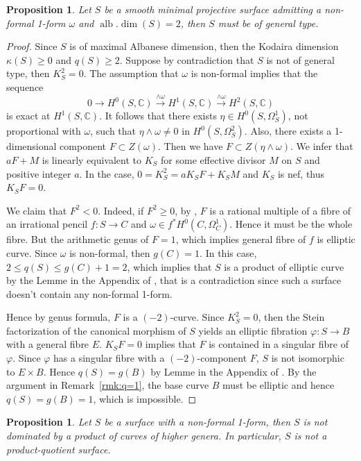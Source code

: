\documentclass[a4paper,12pt,reqno]{amsart}
\newtheorem{proposition}[theorem]{Proposition}
\theoremstyle{question}
\theoremstyle{definition}
\theoremstyle{remark}
\theoremstyle{cited}
\theoremstyle{citeddef}
\def\CC{{\mathbb C}}
\def\phi{{\varphi}}
\DeclareMathOperator{\alb}{alb}
\begin{document}


\begin{proposition}
    Let $S$ be a smooth minimal projective surface admitting a non-formal 1-form $\omega$ and $\alb.\dim(S)=2$, then $S$ must be of general type.
\end{proposition}
\begin{proof}
    Since $S$ is of maximal Albanese dimension, then the Kodaira dimension $\kappa(S)\geq 0$ and $q(S)\geq 2$. Suppose by contradiction that $S$ is not of general type, then $K_S^2=0$. The assumption that $\omega$ is non-formal implies that the sequence \[
 0\to H^0(S,\CC) \xrightarrow{\wedge \omega} H^1(S,\CC) \xrightarrow{\wedge \omega} H^2(S,\CC) 
 \]
        is exact at $H^1(S,\CC)$. It follows that there exists $\eta\in H^0(S, \Omega_S^1)$, not proportional with $\omega$, such that $\eta\wedge\omega\neq 0$ in $H^0(S, \Omega_S^2)$. Also, there exists a 1-dimensional component $F\subset Z(\omega)$. Then we have  $F\subset Z(\eta\wedge\omega)$. We infer that $aF+M$ is linearly equivalent to $K_S$ for some effective divisor $M$ on $S$ and positive integer $a$. In the case, $0=K_S^2=aK_SF+K_SM$ and $K_S$ is nef, thus $K_SF=0$. 
        
        We claim that $F^2<0$. Indeed, if $F^2\geq 0$, by \cite[Theorem~1]{Spu88}, $F$ is a rational multiple of a fibre of an irrational pencil $f\colon S\to C$ and $\omega\in f^{\ast}H^0(C, \Omega_C^1)$. Hence it must be the whole fibre. But the arithmetic genus of $F=1$, which implies general fibre of $f$ is elliptic curve. Since $\omega$ is non-formal, then $g(C)=1$. In this case, $2\leq q(S)\leq g(C)+1=2$, which implies that $S$ is a  product of elliptic curve by the Lemme in the Appendix of \cite{Deb82}, that is a contradiction since such a surface doesn't contain any non-formal 1-form. 
        
        Hence by genus formula, $F$ is a $(-2)$-curve. Since $K_S^2=0$, then the Stein factorization of the canonical morphism of $S$ yields an elliptic fibration $\phi\colon S\to B$ with a general fibre $E$. $K_SF=0$ implies that $F$ is contained in a singular fibre of $\phi$. Since $\phi$ has a singular fibre with a $(-2)$-component $F$,  $S$ is not isomorphic to $E\times B$. Hence $q(S)=g(B)$ by Lemme in the Appendix of \cite{Deb82}. By the argument in Remark~\ref{rmk:q=1}, the base curve $B$ must be elliptic and hence $q(S)=g(B)=1$, which is impossible.
\end{proof} 
\begin{proposition}
    Let $S$ be a surface with a non-formal 1-form, then $S$ is not dominated by a product of curves of higher genera. In particular, $S$ is not a product-quotient surface.
\end{proposition}
    
\end{document}
